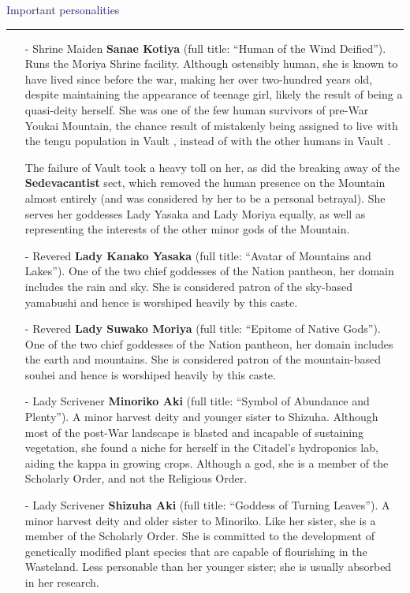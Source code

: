 \documentclass[a4paper,12pt]{book}
\newcommand{\maru}[1]{\raisebox{.5pt}{\textcircled{\raisebox{-.9pt} {#1}}}}
\newcommand{\factionheading}[1]{
\parbox{\textwidth}{
        \vspace{2mm}
        \noindent
        \textcolor{MidnightBlue}{
{\large {#1}
        \vspace*{1mm}
        \hrule}
        \vspace*{3mm}
        \noindent
} } }
\begin{document}
\factionheading{Important personalities}
\begin{itemize}
\item[-] Shrine Maiden \textbf{Sanae Kotiya} (full title: ``Human of the Wind Deified''). Runs the Moriya Shrine facility. Although ostensibly human, she is known to have lived since before the war, making her over two-hundred years old, despite maintaining the appearance of teenage girl, likely the result of being a quasi-deity herself. She was one of the few human survivors of pre-War Youkai Mountain, the chance result of mistakenly being assigned to live with the tengu population in Vault \maru{12}, instead of with the other humans in Vault \maru{13}.

The failure of Vault \maru{13} took a heavy toll on her, as did the breaking away of the \textbf{Sedevacantist} sect, which removed the human presence on the Mountain almost entirely (and was considered by her to be a personal betrayal). She serves her goddesses Lady Yasaka and Lady Moriya equally, as well as representing the interests of the other minor gods of the Mountain.
\item[-] Revered \textbf{Lady Kanako Yasaka} (full title: ``Avatar of Mountains and Lakes''). One of the two chief goddesses of the Nation pantheon, her domain includes the rain and sky. She is considered patron of the sky-based yamabushi and hence is worshiped heavily by this caste.
\item[-] Revered \textbf{Lady Suwako Moriya} (full title: ``Epitome of Native Gods''). One of the two chief goddesses of the Nation pantheon, her domain includes the earth and mountains. She is considered patron of the mountain-based souhei and hence is worshiped heavily by this caste.
\item[-] Lady Scrivener \textbf{Minoriko Aki} (full title: ``Symbol of Abundance and Plenty''). A minor harvest deity and younger sister to Shizuha. Although most of the post-War landscape is blasted and incapable of sustaining vegetation, she found a niche for herself in the Citadel's hydroponics lab, aiding the kappa in growing crops. Although a god, she is a member of the Scholarly Order, and not the Religious Order.
\item[-] Lady Scrivener \textbf{Shizuha Aki} (full title: ``Goddess of Turning Leaves''). A minor harvest deity and older sister to Minoriko. Like her sister, she is a member of the Scholarly Order. She is committed to the development of genetically modified plant species that are capable of flourishing in the Wasteland. Less personable than her younger sister; she is usually absorbed in her research.

\end{itemize}
\end{document}
